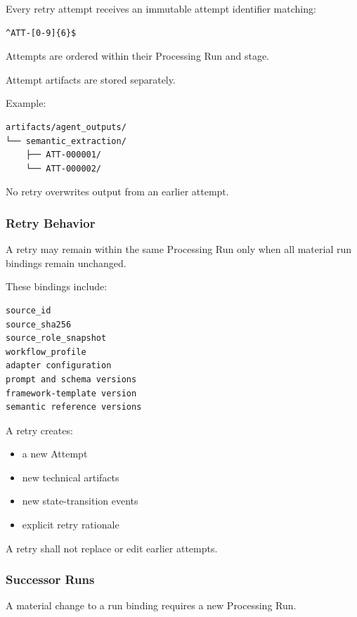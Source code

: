 Every retry attempt receives an immutable attempt identifier matching:

\begin{verbatim}
^ATT-[0-9]{6}$
\end{verbatim}

Attempts are ordered within their Processing Run and stage.

Attempt artifacts are stored separately.

Example:

\begin{verbatim}
artifacts/agent_outputs/
└── semantic_extraction/
    ├── ATT-000001/
    └── ATT-000002/
\end{verbatim}

No retry overwrites output from an earlier attempt.

\hypertarget{retry-behavior}{%
\subsubsection{Retry Behavior}\label{retry-behavior}}

A retry may remain within the same Processing Run only when all material run bindings remain unchanged.

These bindings include:

\begin{verbatim}
source_id
source_sha256
source_role_snapshot
workflow_profile
adapter configuration
prompt and schema versions
framework-template version
semantic reference versions
\end{verbatim}

A retry creates:

\begin{itemize}
\tightlist
\item
  a new Attempt
\item
  new technical artifacts
\item
  new state-transition events
\item
  explicit retry rationale
\end{itemize}

A retry shall not replace or edit earlier attempts.

\hypertarget{successor-runs}{%
\subsubsection{Successor Runs}\label{successor-runs}}

A material change to a run binding requires a new Processing Run.

